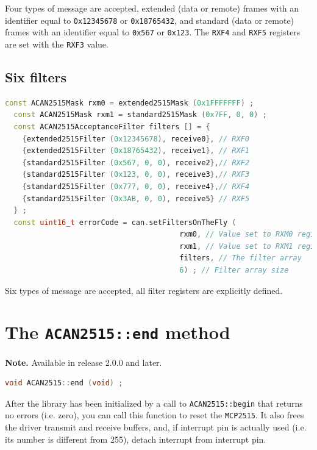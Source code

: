 \documentclass[9pt, a4paper, obeyspaces]{extarticle}
\newcommand \sectionLabel[2]{\section{#1}\label{sec:#2}}
\begin{document}
Four types of message are accepted, extended (data or remote) frames with an identifier equal to \texttt{0x12345678} or \texttt{0x18765432}, and standard (data or remote) frames with an identifier equal to \texttt{0x567} or \texttt{0x123}. The \texttt{RXF4} and \texttt{RXF5} registers are set with the \texttt{RXF3} value.








\subsection{Six filters}
{ \small\begin{lstlisting}[language=c++]
  const ACAN2515Mask rxm0 = extended2515Mask (0x1FFFFFFF) ;
  const ACAN2515Mask rxm1 = standard2515Mask (0x7FF, 0, 0) ;
  const ACAN2515AcceptanceFilter filters [] = {
    {extended2515Filter (0x12345678), receive0}, // RXF0
    {extended2515Filter (0x18765432), receive1}, // RXF1
    {standard2515Filter (0x567, 0, 0), receive2},// RXF2
    {standard2515Filter (0x123, 0, 0), receive3},// RXF3
    {standard2515Filter (0x777, 0, 0), receive4},// RXF4
    {standard2515Filter (0x3AB, 0, 0), receive5} // RXF5
  } ;
  const uint16_t errorCode = can.setFiltersOnTheFly (
                                        rxm0, // Value set to RXM0 register
                                        rxm1, // Value set to RXM1 register
                                        filters, // The filter array
                                        6) ; // Filter array size
\end{lstlisting}}

Six types of message are accepted, all filter registers are explicitly defined.














\sectionLabel{The \texttt{ACAN2515::end} method}{endFunction}

{\bf Note. } Available in release 2.0.0 and later.

{ \small\begin{lstlisting}[language=c++]
void ACAN2515::end (void) ;
\end{lstlisting}}

After the library has been initialized by a call to \texttt{ACAN2515::begin} that returns no errors (i.e. zero), you can call this function to reset the \texttt{MCP2515}. It also frees the driver transmit and receive buffers, and, if interrupt pin is actually used (i.e. its number is different from 255), detach interrupt from interrupt pin.
\end{document}
